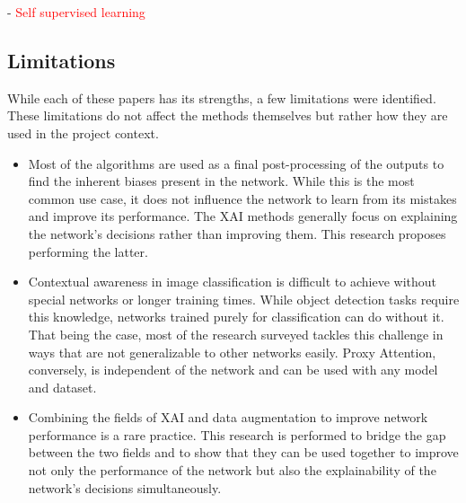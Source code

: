 - \textcolor{red}{Self supervised learning}

\subsection{Limitations}
While each of these papers has its strengths, a few limitations were identified. These limitations do not affect the methods themselves but rather how they are used in the project context.
\begin{itemize}
    \item Most of the algorithms are used as a final post-processing of the outputs to find the inherent biases present in the network. While this is the most common use case, it does not influence the network to learn from its mistakes and improve its performance. The XAI methods generally focus on explaining the network's decisions rather than improving them. This research proposes performing the latter.
    \item Contextual awareness in image classification is difficult to achieve without special networks or longer training times. While object detection tasks require this knowledge, networks trained purely for classification can do without it. That being the case, most of the research surveyed tackles this challenge in ways that are not generalizable to other networks easily. Proxy Attention, conversely, is independent of the network and can be used with any model and dataset. 
    \item Combining the fields of XAI and data augmentation to improve network performance is a rare practice. This research is performed to bridge the gap between the two fields and to show that they can be used together to improve not only the performance of the network but also the explainability of the network's decisions simultaneously.

\end{itemize}